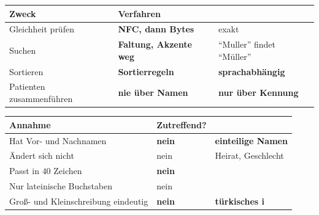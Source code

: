 \begin{merksatz}
\begin{center}
{\small
\renewcommand{\arraystretch}{1.5}
\begin{tabular}{@{}P{3.0cm}P{2.4cm}P{2.6cm}@{}}
\toprule
\textbf{Zweck} & \textbf{Verfahren} & \\
\midrule
Gleichheit prüfen & \textbf{NFC, dann Bytes} & \textcolor{gruen}{exakt}\\
Suchen & \textbf{Faltung, Akzente weg} & \textcolor{gruen}{\enquote{Muller} findet \enquote{Müller}}\\
Sortieren & \textbf{Sortierregeln} & \textcolor{akzent}{\textbf{sprachabhängig}}\\
Patienten zusammenführen & \textcolor{akzent}{\textbf{nie über Namen}} & \textcolor{akzent}{\textbf{nur über Kennung}}\\
\bottomrule
\end{tabular}}
\end{center}

\begin{center}
\begin{minipage}{0.88\textwidth}
\end{minipage}
\end{center}

\begin{center}
\end{center}

\begin{warnung}
\begin{center}
{\small
\renewcommand{\arraystretch}{1.5}
\begin{tabular}{@{}P{3.2cm}P{2.2cm}P{2.6cm}@{}}
\toprule
\textbf{Annahme} & \textbf{Zutreffend?} & \\
\midrule
Hat Vor- und Nachnamen & \textcolor{akzent}{\textbf{nein}} & \textbf{einteilige Namen}\\
Ändert sich nicht & \textcolor{akzent}{nein} & \textcolor{akzent}{Heirat, Geschlecht}\\
Passt in $40$ Zeichen & \textcolor{akzent}{\textbf{nein}} & \\
Nur lateinische Buchstaben & \textcolor{akzent}{nein} & \\
Groß- und Kleinschreibung eindeutig & \textcolor{akzent}{\textbf{nein}} & \textcolor{akzent}{\textbf{türkisches i}}\\
\bottomrule
\end{tabular}}
\end{center}


\end{warnung}
\end{merksatz}

